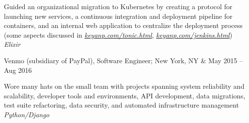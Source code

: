 \documentclass[letterpaper,hidelinks]{scrartcl}
\begin{document}
\begin{list1}
\begin{list2}
  \item Guided an organizational migration to Kubernetes by creating a protocol for launching new services, a continuous integration and deployment pipeline for containers, and an internal web application to centralize the deployment process (some aspects discussed in \href{https://keyanp.com/tonic.html}{\emph{keyanp.com/tonic.html}}, \href{https://keyanp.com/jenkins.html}{\emph{keyanp.com/jenkins.html}}) \hfill\emph{Elixir}
  \end{list2}

\item \begin{tabular1bold} Venmo (subsidiary of PayPal), Software Engineer; New York, NY & May 2015 -- Aug 2016 \end{tabular1bold}

  \begin{list2}
  \item Wore many hats on the small team with projects spanning system reliability and scalability, developer tools and environments, API development, data migrations, test suite refactoring, data security, and automated infrastructure management \hfill\emph{Python/Django}
  \end{list2}

\end{list1}
%
%
\end{document}
